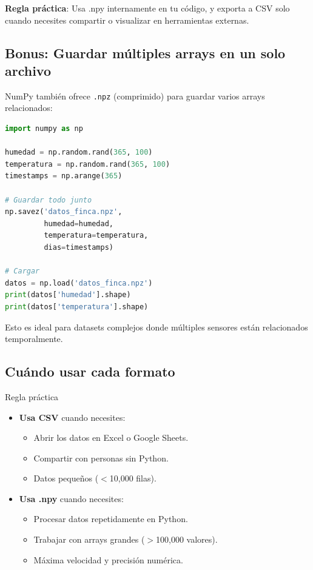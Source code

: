 \documentclass[11pt, a4paper]{article}
\begin{document}
\textbf{Regla práctica}: Usa .npy internamente en tu código, y exporta a CSV solo cuando necesites compartir o visualizar en herramientas externas.

\subsection{Bonus: Guardar múltiples arrays en un solo archivo}

NumPy también ofrece \texttt{.npz} (comprimido) para guardar varios arrays relacionados:

\begin{lstlisting}[language=Python, caption={Guardar múltiples variables en .npz}]
import numpy as np

humedad = np.random.rand(365, 100)
temperatura = np.random.rand(365, 100)
timestamps = np.arange(365)

# Guardar todo junto
np.savez('datos_finca.npz',
         humedad=humedad,
         temperatura=temperatura,
         dias=timestamps)

# Cargar
datos = np.load('datos_finca.npz')
print(datos['humedad'].shape)
print(datos['temperatura'].shape)
\end{lstlisting}

Esto es ideal para datasets complejos donde múltiples sensores están relacionados temporalmente.

\subsection{Cuándo usar cada formato}

\begin{agrobox}{Regla práctica}
\begin{itemize}
    \item \textbf{Usa CSV} cuando necesites:
    \begin{itemize}
        \item Abrir los datos en Excel o Google Sheets.
        \item Compartir con personas sin Python.
        \item Datos pequeños ($<$10,000 filas).
    \end{itemize}
    \item \textbf{Usa .npy} cuando necesites:
    \begin{itemize}
        \item Procesar datos repetidamente en Python.
        \item Trabajar con arrays grandes ($>$100,000 valores).
        \item Máxima velocidad y precisión numérica.
    \end{itemize}
\end{itemize}
\end{agrobox}
\end{document}
